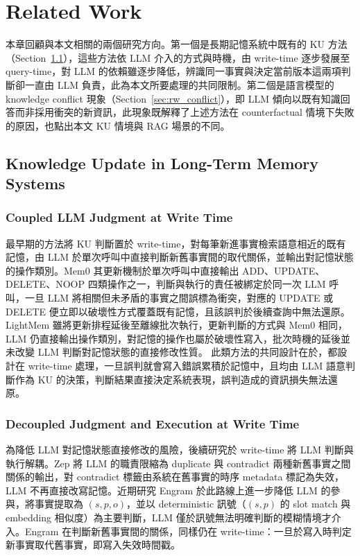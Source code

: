 \chapter{Related Work}
\label{ch:related_work}
本章回顧與本文相關的兩個研究方向。第一個是長期記憶系統中既有的 KU 方法（Section~\ref{sec:rw_ku}），這些方法依 LLM 介入的方式與時機，由 write-time 逐步發展至 query-time，對 LLM 的依賴雖逐步降低，辨識同一事實與決定當前版本這兩項判斷卻一直由 LLM 負責，此為本文所要處理的共同限制。第二個是語言模型的 knowledge conflict 現象（Section~\ref{sec:rw_conflict}），即 LLM 傾向以既有知識回答而非採用衝突的新資訊，此現象既解釋了上述方法在 counterfactual 情境下失敗的原因，也點出本文 KU 情境與 RAG 場景的不同。
\section{Knowledge Update in Long-Term Memory Systems}
\label{sec:rw_ku}
\subsection{Coupled LLM Judgment at Write Time}
最早期的方法將 KU 判斷置於 write-time，對每筆新進事實檢索語意相近的既有記憶，由 LLM 於單次呼叫中直接判斷新舊事實間的取代關係，並輸出對記憶狀態的操作類別。Mem0 \cite{chhikara2025mem0} 其更新機制於單次呼叫中直接輸出 ADD、UPDATE、DELETE、NOOP 四類操作之一，判斷與執行的責任被綁定於同一次 LLM 呼叫，一旦 LLM 將相關但未矛盾的事實之間誤標為衝突，對應的 UPDATE 或 DELETE 便立即以破壞性方式覆蓋既有記憶，且該誤判於後續查詢中無法還原。LightMem \cite{fang2026lightmem} 雖將更新排程延後至離線批次執行，更新判斷的方式與 Mem0 相同，LLM 仍直接輸出操作類別，對記憶的操作也屬於破壞性寫入，批次時機的延後並未改變 LLM 判斷對記憶狀態的直接修改性質。
此類方法的共同設計在於，都設計在 write-time 處理，一旦誤判就會寫入錯誤累積於記憶中，且均由 LLM 語意判斷作為 KU 的決策，判斷結果直接決定系統表現，誤判造成的資訊損失無法還原。

\subsection{Decoupled Judgment and Execution at Write Time}
為降低 LLM 對記憶狀態直接修改的風險，後續研究於 write-time 將 LLM 判斷與執行解耦。Zep \cite{rasmussen2025zep} 將 LLM 的職責限縮為 duplicate 與 contradict 兩種新舊事實之間關係的輸出，對 contradict 標籤由系統在舊事實的時序 metadata 標記為失效， LLM 不再直接改寫記憶。近期研究 Engram \cite{wang2026less} 於此路線上進一步降低 LLM 的參與，將事實提取為 $(s, p, o)$，並以 deterministic 訊號（$(s, p)$ 的 slot match 與 embedding 相似度）為主要判斷，LLM 僅於訊號無法明確判斷的模糊情境才介入。Engram 在判斷新舊事實間的關係，同樣仍在 write-time：一旦於寫入時判定新事實取代舊事實，即寫入失效時間戳。

